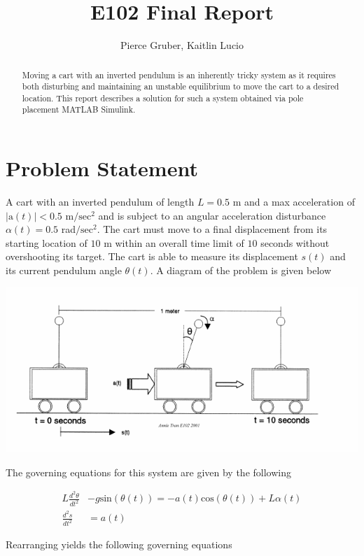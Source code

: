 \documentclass[12pt]{article}
\title{E102 Final Report}
\author{Pierce Gruber, Kaitlin Lucio}
\begin{document}
\maketitle

\begin{abstract}
Moving a cart with an inverted pendulum is an inherently tricky system as it requires both disturbing and maintaining an unstable equilibrium to move the cart to a desired location. This report describes a solution for such a system obtained via pole placement MATLAB Simulink.
\end{abstract}

\section{Problem Statement}
A cart with an inverted pendulum of length $L = 0.5\text{ m}$ and a max acceleration of $|\text{a}(t)| < 0.5 \text{ m}/\text{sec}^2$ and is subject to an angular acceleration disturbance $\alpha(t) = 0.5$ rad$/\text{sec}^{2}$. The cart must move to a final displacement from its starting location of $10$ m within an overall time limit of $10$ seconds without overshooting its target. The cart is able to measure its displacement $s(t)$ and its current pendulum angle $\theta(t)$. A diagram of the problem is given below

\begin{center}
    \includegraphics{graphs/invpen.png}
\end{center}
\newpage
The governing equations for this system are given by the following

\begin{align*}
    L\frac{d^{2}\theta}{dt^{2}} &- g\text{sin}(\theta(t)) = -a(t)\text{cos}(\theta(t)) + L\alpha(t) \\
    \frac{d^2s}{dt^2} &= a(t)
\end{align*}

Rearranging yields the following governing equations
\end{document}
